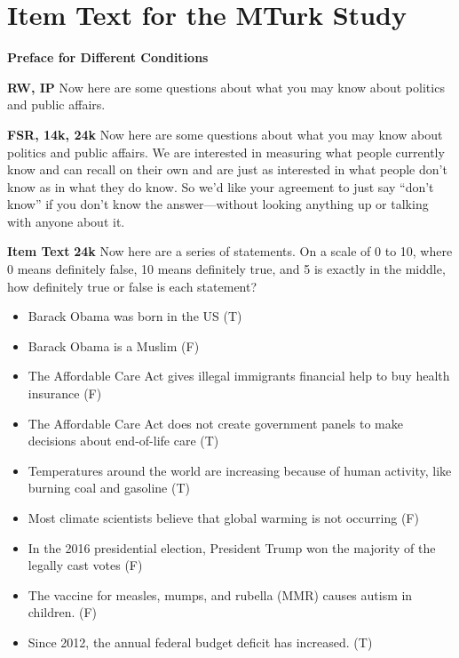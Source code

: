 \clearpage
\section{Item Text for the MTurk Study}\label{si:mturk}

\textbf{Preface for Different Conditions}

\textbf{RW, IP}\newline
Now here are some questions about what you may know about politics and public affairs.

\textbf{FSR, 14k, 24k}\newline
Now here are some questions about what you may know about politics and public affairs.
We are interested in measuring what people currently know and can recall on their own and are
just as interested in what people don't know as in what they do know. So we'd like your
agreement to just say ``don't know'' if you don't know the answer—without looking anything up
or talking with anyone about it.

\textbf{Item Text}
\textbf{24k}\newline
Now here are a series of statements. On a scale of 0 to 10, where 0 means definitely false,
10 means definitely true, and 5 is exactly in the middle, how definitely true or false is
each statement?

\begin{itemize}
	\item Barack Obama was born in the US (T)
	\item  Barack Obama is a Muslim (F)
	\item  The Affordable Care Act gives illegal immigrants financial help to buy health insurance (F)
	\item  The Affordable Care Act does not create government panels to make decisions about end-of-life care (T)
	\item  Temperatures around the world are increasing because of human activity, like burning coal and gasoline (T)
	\item  Most climate scientists believe that global warming is not occurring (F)
	\item  In the 2016 presidential election, President Trump won the majority of the legally cast votes (F)
	\item  The vaccine for measles, mumps, and rubella (MMR) causes autism in children. (F)
	\item  Since 2012, the annual federal budget deficit has increased. (T)
\end{itemize}

